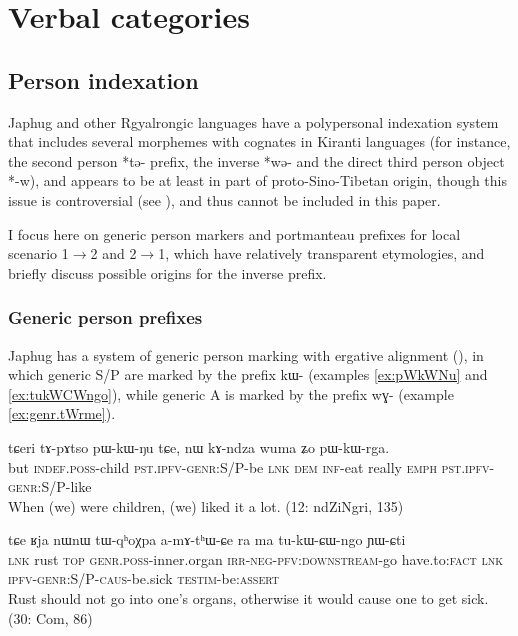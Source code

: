 \documentclass[oldfontcommands,oneside,a4paper,11pt]{article}
\newcommand{\ipa}[1]{\mbox{\phon #1}} %
\begin{document}
  \section{Verbal categories} 

\subsection{Person indexation} 
Japhug and other Rgyalrongic languages have a polypersonal indexation system that includes several morphemes with cognates in Kiranti languages (for instance, the second person *\ipa{tə-} prefix, the inverse *\ipa{wə-} and the direct third person object *\ipa{-w}), and appears to be at least in part of proto-Sino-Tibetan origin, though this issue is controversial (see \citealt{delancey11prefixes, jacques12agreement}), and thus cannot be included in this paper.


I focus here on generic person markers and portmanteau prefixes for local scenario 1$\rightarrow$2 and 2$\rightarrow$1, which have relatively transparent etymologies, and briefly discuss possible origins for the inverse prefix.


\subsubsection{Generic person prefixes}

Japhug has a system of generic person marking with ergative alignment (\citealt{jacques12demotion}), in which generic S/P are marked by the prefix \ipa{kɯ-} (examples \ref{ex:pWkWNu} and \ref{ex:tukWCWngo}), while generic A is marked by the prefix \ipa{wɣ-} (example \ref{ex:genr.tWrme}).


\begin{exe}
\ex \label{ex:pWkWNu}
\gll
\ipa{tɕeri} 	\ipa{tɤ-pɤtso} 	\ipa{pɯ-kɯ-ŋu} 	\ipa{tɕe,} 	\ipa{nɯ} 	\ipa{kɤ-ndza} 	\ipa{wuma} 	\ipa{ʑo} 	\ipa{pɯ-kɯ-rga.} \\
but \textsc{indef.poss}-child \textsc{pst.ipfv-genr}:S/P-be \textsc{lnk} \textsc{dem} \textsc{inf}-eat really \textsc{emph} \textsc{pst.ipfv-genr}:S/P-like \\
\glt When (we) were children, (we) liked it a lot. (12: ndZiNgri, 135)
\end{exe}


\begin{exe}
\ex \label{ex:tukWCWngo}
\gll  \ipa{tɕe} 	\ipa{ʁja} 	\ipa{nɯnɯ} 	\ipa{tɯ-qʰoχpa} 	\ipa{a-mɤ-tʰɯ-ɕe} 	\ipa{ra} 	\ipa{ma} 	\ipa{tu-kɯ-ɕɯ-ngo} 	\ipa{ɲɯ-ɕti} \\
\textsc{lnk} rust \textsc{top} \textsc{genr.poss}-inner.organ \textsc{irr-neg-pfv:downstream}-go have.to:\textsc{fact} \textsc{lnk} \textsc{ipfv-genr:S/P-caus}-be.sick  \textsc{testim}-be:\textsc{assert} \\
\glt Rust should not go into one's organs, otherwise it would cause one to get sick. (30: Com, 86)
\end{exe}
\end{document}
